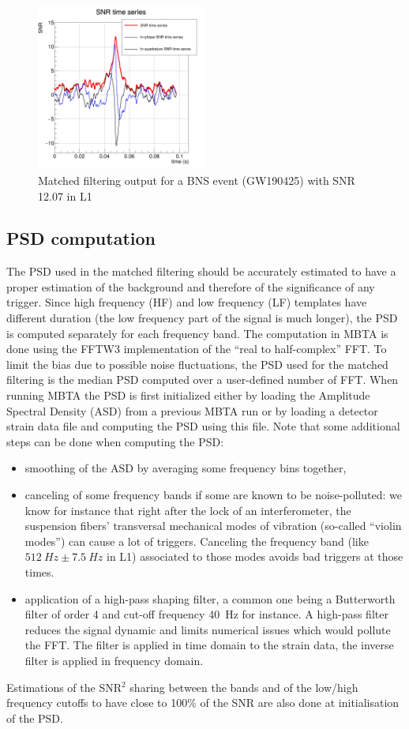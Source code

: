 \begin{figure}[ht]
  \centering
  \includegraphics[width=0.5\textwidth]{sectionMBTA/cMfo.png}
  \caption{Matched filtering output for a BNS event (GW190425) with SNR 12.07 in L1}
  \label{fig:ex_mfos}
\end{figure}

\subsection{PSD computation}
\label{sec:psd_compute}
The PSD used in the matched filtering should be accurately estimated to have a proper estimation of the background and therefore of the significance of any trigger.
Since high frequency (HF) and low frequency (LF) templates have different duration (the low frequency part of the signal is much longer), the PSD is computed separately for each frequency band.
The computation in MBTA is done using the FFTW3 \cite{FFTW3} implementation of the ``real to half-complex'' FFT.
To limit the bias due to possible noise fluctuations, the PSD used for the matched filtering is the median PSD computed over a user-defined number of FFT.
When running MBTA the PSD is first initialized either by loading the Amplitude Spectral Density (ASD) from a previous MBTA run or by loading a detector strain data file and computing the PSD using this file.
Note that some additional steps can be done when computing the PSD:
\begin{itemize}
\item smoothing of the ASD by averaging some frequency bins together,
\item canceling of some frequency bands if some are known to be noise-polluted: we know for instance that right after the lock of an interferometer, the suspension fibers' transversal mechanical modes of vibration (so-called ``violin modes'') can cause a lot of triggers.
  Canceling the frequency band (like $\SI{512}{Hz} \pm \SI{7.5}{Hz}$ in L1) associated to those modes avoids bad triggers at those times.
\item application of a high-pass shaping filter, a common one being a Butterworth filter of order 4 and cut-off frequency \SI{40}{\hertz} for instance.
  A high-pass filter reduces the signal dynamic and limits numerical issues which would pollute the FFT.
  The filter is applied in time domain to the strain data, the inverse filter is applied in frequency domain.
\end{itemize}
Estimations of the SNR$^2$ sharing between the bands and of the low/high frequency cutoffs to have close to 100\% of the SNR are also done at initialisation of the PSD.


